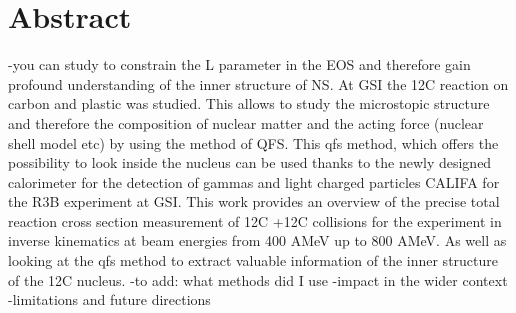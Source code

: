\thispagestyle{empty}
\section*{Abstract}
-you can study to constrain the L parameter  in the EOS and therefore gain profound understanding of the inner structure of NS.\newline
At GSI the 12C reaction on carbon and plastic was studied. This allows to study the microstopic structure and therefore the composition of nuclear matter and the acting force (nuclear shell model etc) by using the method of QFS.\newline
This qfs method, which offers the possibility to look inside the nucleus can be used thanks to the newly designed calorimeter for the detection of gammas and light charged particles CALIFA for the R3B experiment at GSI.\newline
This work provides an overview of the precise total reaction cross section measurement of 12C +12C collisions for the experiment in inverse kinematics at beam energies from 400 AMeV up to 800 AMeV. As well as looking at the qfs method to extract valuable information of the inner structure of the 12C nucleus.\newline
-to add: what methods did I use\newline
-impact in the wider context\newline
-limitations and future directions\newline
